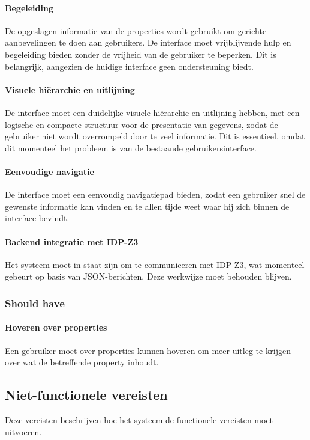 \paragraph{Begeleiding}
De opgeslagen informatie van de properties wordt gebruikt om gerichte aanbevelingen te doen aan gebruikers. De interface moet vrijblijvende hulp en begeleiding bieden zonder de vrijheid van de gebruiker te beperken. Dit is belangrijk, aangezien de huidige interface geen ondersteuning biedt.

\paragraph{Visuele hiërarchie en uitlijning}
De interface moet een duidelijke visuele hiërarchie en uitlijning hebben, met een logische en compacte structuur voor de presentatie van gegevens, zodat de gebruiker niet wordt overrompeld door te veel informatie. Dit is essentieel, omdat dit momenteel het probleem is van de bestaande gebruikersinterface.

\paragraph{Eenvoudige navigatie}
De interface moet een eenvoudig navigatiepad bieden, zodat een gebruiker snel de gewenste informatie kan vinden en te allen tijde weet waar hij zich binnen de interface bevindt.

\paragraph{Backend integratie met IDP-Z3}
Het systeem moet in staat zijn om te communiceren met IDP-Z3, wat momenteel gebeurt op basis van JSON-berichten. Deze werkwijze moet behouden blijven.

\subsubsection{Should have}
\paragraph{Hoveren over properties}
Een gebruiker moet over properties kunnen hoveren om meer uitleg te krijgen over wat de betreffende property inhoudt.

\subsection{Niet-functionele vereisten}
Deze vereisten beschrijven hoe het systeem de functionele vereisten moet uitvoeren. 

